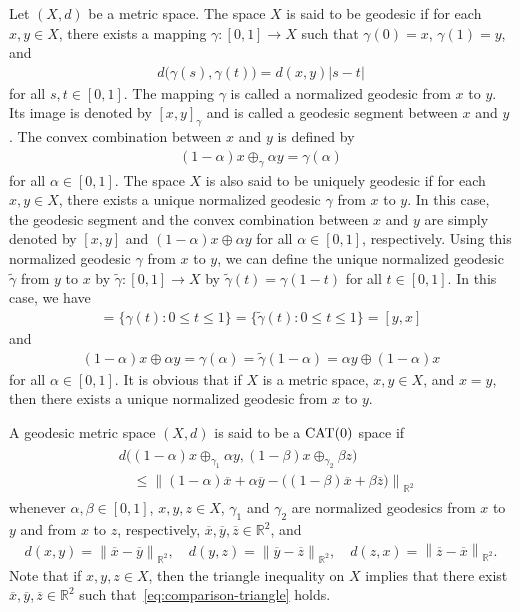\documentclass[draft]{amsart}
\numberwithin{equation}{section}
\def\R{\mathbb R}
\providecommand{\norm}[1]{\left\lVert#1\right\rVert}
\providecommand{\abs}[1]{\left\lvert#1\right\rvert}
\newcommand{\CAT}{\textup{CAT}}
\theoremstyle{plain}
\theoremstyle{definition}
\theoremstyle{remark}
\begin{document}
Let $(X,d)$ be a metric space. The space $X$ is said to be 
geodesic if for each $x,y\in X$, there exists 
a mapping $\gamma\colon [0,1]\to X$ such that 
$\gamma(0)=x$, $\gamma(1)=y$, and 
\begin{align}
 d\bigl(\gamma(s), \gamma(t)\bigr) = d(x,y)\abs{s-t}
\end{align}
for all $s,t\in [0,1]$. 
The mapping $\gamma$ is called a normalized geodesic from $x$ to $y$. 
Its image is denoted by $[x,y]_{\gamma}$ 
and is called a geodesic segment between $x$ and $y$.  
The convex combination between $x$ and $y$ is defined by 
\begin{align}
 (1-\alpha) x\oplus_{\gamma} \alpha y = \gamma (\alpha)
\end{align}
for all $\alpha \in [0,1]$. 
The space $X$ is also said to be uniquely geodesic if 
for each $x,y\in X$, there exists a unique 
normalized geodesic $\gamma$ from $x$ to $y$. 
In this case, the geodesic segment and 
the convex combination between $x$ and $y$ are simply denoted by $[x,y]$ 
and $(1-\alpha) x\oplus \alpha y$ for all $\alpha \in [0,1]$, 
respectively. 
Using this normalized geodesic $\gamma$ from $x$ to $y$, we can define 
the unique normalized geodesic $\tilde{\gamma}$ from $y$ to $x$ 
by $\tilde{\gamma} \colon [0,1] \to X$ by $\tilde{\gamma}(t)=\gamma(1-t)$
for all $t\in [0,1]$.  In this case, we have 
\begin{align}
 [x,y]=\{\gamma(t): 0\leq t\leq 1\} 
 =\{\tilde{\gamma}(t): 0\leq t\leq 1\}=[y,x] 
\end{align}
and 
\begin{align}
 (1-\alpha) x \oplus \alpha y
=\gamma(\alpha) 
=\tilde{\gamma}(1-\alpha)
=\alpha y \oplus (1-\alpha) x
\end{align}
for all $\alpha \in [0,1]$. 
It is obvious that if $X$ is a metric space, $x,y\in X$, and $x=y$, then 
there exists a unique normalized geodesic from $x$ to $y$. 
\fi

A geodesic metric space $(X,d)$ is said to be a $\CAT(0)$ space 
if 
\begin{align}
 \begin{split}
 &d\bigl(
(1-\alpha)x\oplus_{\gamma_1} \alpha y, 
(1-\beta)x \oplus_{\gamma_2} \beta z
 \bigr) \\
 &\quad \leq 
 \norm{
 (1-\alpha)\overline{x}+ \alpha \overline{y}
 - 
 \bigl((1-\beta)\overline{x} + \beta \overline{z}\bigr)
 }_{\R^2}  
 \end{split}
\end{align}
whenever $\alpha, \beta\in [0,1]$, 
$x,y,z\in X$, 
$\gamma_1$ and $\gamma_2$ are normalized geodesics 
from $x$ to $y$ and from $x$ to $z$, respectively, 
$\overline{x}, \overline{y}, \overline{z}\in \R^2$, 
and 
\begin{align}\label{eq:comparison-triangle}
 d(x,y)=\norm{\overline{x}-\overline{y}}_{\R^2}, \quad 
 d(y,z)=\norm{\overline{y}-\overline{z}}_{\R^2}, \quad 
 d(z,x)=\norm{\overline{z}-\overline{x}}_{\R^2}.  
\end{align}
Note that if $x,y,z\in X$, then the triangle inequality on $X$ 
implies that there exist 
$\overline{x}, \overline{y}, \overline{z}\in \R^2$ 
such that~\eqref{eq:comparison-triangle} holds. 
\end{document}
